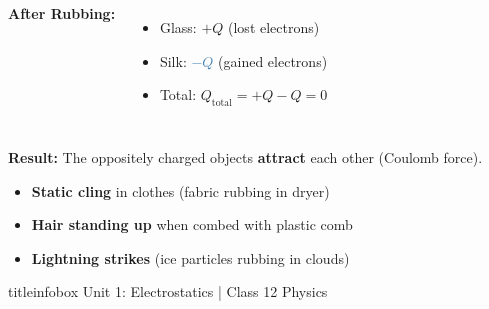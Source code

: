 \begin{frame}
\begin{examplebox}
\begin{columns}[T]
    \textbf{After Rubbing:}
    \begin{itemize}
        \item Glass: \textcolor{importantRed}{$+Q$} (lost electrons)
        \item Silk: \textcolor{steelblue}{$-Q$} (gained electrons)
        \item Total: $Q_{\text{total}} = +Q - Q = 0$ 
    \end{itemize}
\end{columns}

\vspace{0.25cm}

\textbf{Result:} The oppositely charged objects \textbf{\textcolor{familiarGreen}{attract}} each other (Coulomb force).
\end{examplebox}

\vspace{0.3cm}

\begin{importantbox}
\vspace{0.05cm}
\begin{itemize}
    \item \textbf{Static cling} in clothes (fabric rubbing in dryer)
    \item \textbf{Hair standing up} when combed with plastic comb
    \item \textbf{Lightning strikes} (ice particles rubbing in clouds)
\end{itemize}
\vspace{0.05cm}
\end{importantbox}

\vfill

\begin{beamercolorbox}[wd=\textwidth,ht=0.5cm,dp=0.1cm,center]{titleinfobox}
    \small\color{coolgray} Unit 1: Electrostatics | Class 12 Physics
\end{beamercolorbox}
\end{frame}

